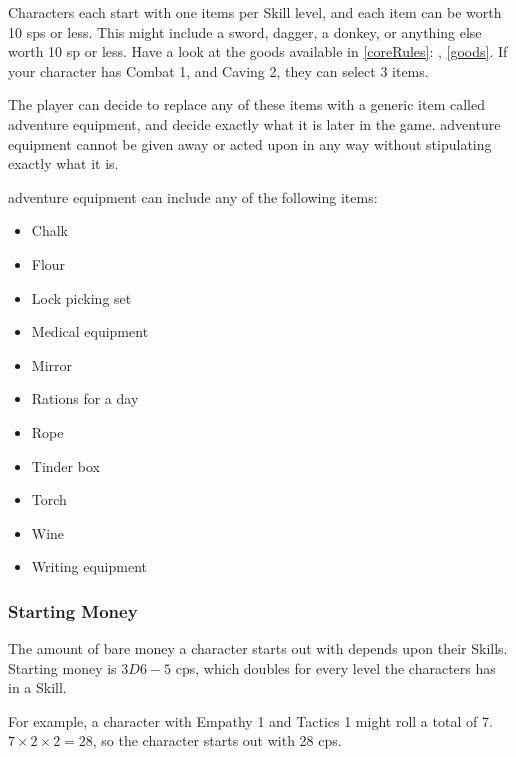 \begin{multicols}{2}
\label{adventuringequipment}

Characters each start with one items per Skill level, and each item can be worth 10 \glspl{sp} or less.
This might include a sword, dagger, a donkey, or anything else worth 10 \gls{sp} or less.
Have a look at the goods available in \autoref{coreRules}: , \autoref{goods}.
If your character has Combat 1, and Caving 2, they can select 3 items.

The player can decide to replace any of these items with a generic item called \gls{adventure} equipment, and decide exactly what it is later in the game.
\Gls{adventure} equipment cannot be given away or acted upon in any way without stipulating exactly what it is.

\Gls{adventure} equipment can include any of the following items:

\begin{multicols}{2}
\begin{itemize}

\item{Chalk}
\item{Flour}
\item{Lock picking set}
\item{Medical equipment}
\item{Mirror}
\item{Rations for a day}
\item{Rope}
\item{Tinder box}
\item{Torch}
\item{Wine}
\item{Writing equipment}

\end{itemize}
\end{multicols}

\subsubsection{Starting Money}

The amount of bare money a character starts out with depends upon their Skills.
Starting money is $3D6-5$ \glspl{cp}, which doubles for every level the characters has in a Skill.

For example, a character with Empathy 1 and Tactics 1 might roll a total of 7.
$7\times2\times2 = 28$, so the character starts out with 28 \glspl{cp}.


\end{multicols}

